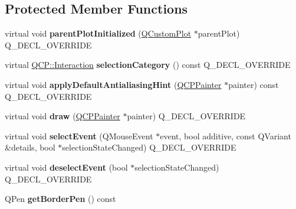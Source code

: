 \subsection*{Protected Member Functions}
\begin{DoxyCompactItemize}
\item 
virtual void {\bfseries parent\+Plot\+Initialized} (\hyperlink{class_q_custom_plot}{Q\+Custom\+Plot} $\ast$parent\+Plot) Q\+\_\+\+D\+E\+C\+L\+\_\+\+O\+V\+E\+R\+R\+I\+DE\hypertarget{class_q_c_p_legend_a2b225cefb5eb267771e2c7c44fd2b408}{}\label{class_q_c_p_legend_a2b225cefb5eb267771e2c7c44fd2b408}

\item 
virtual \hyperlink{namespace_q_c_p_a2ad6bb6281c7c2d593d4277b44c2b037}{Q\+C\+P\+::\+Interaction} {\bfseries selection\+Category} () const Q\+\_\+\+D\+E\+C\+L\+\_\+\+O\+V\+E\+R\+R\+I\+DE\hypertarget{class_q_c_p_legend_a1a2075e462984f9ff51d9c75bda3581b}{}\label{class_q_c_p_legend_a1a2075e462984f9ff51d9c75bda3581b}

\item 
virtual void {\bfseries apply\+Default\+Antialiasing\+Hint} (\hyperlink{class_q_c_p_painter}{Q\+C\+P\+Painter} $\ast$painter) const Q\+\_\+\+D\+E\+C\+L\+\_\+\+O\+V\+E\+R\+R\+I\+DE\hypertarget{class_q_c_p_legend_a817f75c234f82a2e26643dc0de742095}{}\label{class_q_c_p_legend_a817f75c234f82a2e26643dc0de742095}

\item 
virtual void {\bfseries draw} (\hyperlink{class_q_c_p_painter}{Q\+C\+P\+Painter} $\ast$painter) Q\+\_\+\+D\+E\+C\+L\+\_\+\+O\+V\+E\+R\+R\+I\+DE\hypertarget{class_q_c_p_legend_a74f93358d2b4a76ec95c3a5d825582a3}{}\label{class_q_c_p_legend_a74f93358d2b4a76ec95c3a5d825582a3}

\item 
virtual void {\bfseries select\+Event} (Q\+Mouse\+Event $\ast$event, bool additive, const Q\+Variant \&details, bool $\ast$selection\+State\+Changed) Q\+\_\+\+D\+E\+C\+L\+\_\+\+O\+V\+E\+R\+R\+I\+DE\hypertarget{class_q_c_p_legend_a71f54a05c3e5b1a1ade1864422cd642e}{}\label{class_q_c_p_legend_a71f54a05c3e5b1a1ade1864422cd642e}

\item 
virtual void {\bfseries deselect\+Event} (bool $\ast$selection\+State\+Changed) Q\+\_\+\+D\+E\+C\+L\+\_\+\+O\+V\+E\+R\+R\+I\+DE\hypertarget{class_q_c_p_legend_ac2066837f7ebc32a5b15434cdca5b176}{}\label{class_q_c_p_legend_ac2066837f7ebc32a5b15434cdca5b176}

\item 
Q\+Pen {\bfseries get\+Border\+Pen} () const \hypertarget{class_q_c_p_legend_a60172c9d2212584f38f5d0c1e50970c7}{}\label{class_q_c_p_legend_a60172c9d2212584f38f5d0c1e50970c7}


\end{DoxyCompactItemize}
